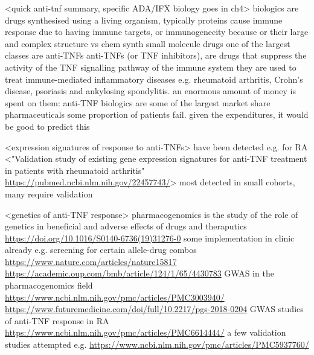 \begin{outline}

\1 <quick anti-tnf summary, specific ADA/IFX biology goes in ch4>
    \2 biologics are drugs synthesised using a living organism, typically proteins
    \2 cause immune response due to having immune targets, or immunogenecity because or their large and complex structure vs chem synth small molecule drugs
    \2 one of the largest classes are anti-TNFs
    \2 anti-TNFs (or TNF inhibitors), are drugs that suppress the activity of the TNF signalling pathway of the immune system
    \2 they are used to treat immune-mediated inflammatory diseases e.g. rheumatoid arthritis, Crohn's disease, psoriasis and ankylosing spondylitis.
    \2 an enormous amount of money is spent on them: anti-TNF biologics are some of the largest market share pharmaceuticals
    \2 some proportion of patients fail. given the expenditures, it would be good to predict this


\1 <expression signatures of response to anti-TNFs>
    \2 have been detected e.g. for RA <"Validation study of existing gene expression signatures for anti-TNF treatment in patients with rheumatoid arthritis" \url{https://pubmed.ncbi.nlm.nih.gov/22457743/}>
    \2 most detected in small cohorts, many require validation

\1 <genetics of anti-TNF response>
    \2 pharmacogenomics is the study of the role of genetics in beneficial and adverse effects of drugs and theraputics \url{https://doi.org/10.1016/S0140-6736(19)31276-0}
    \2 some implementation in clinic already e.g. screening for certain allele-drug combos \url{https://www.nature.com/articles/nature15817} \url{https://academic.oup.com/bmb/article/124/1/65/4430783}
    \2 GWAS in the pharmacogenomics field \url{https://www.ncbi.nlm.nih.gov/pmc/articles/PMC3003940/} \url{https://www.futuremedicine.com/doi/full/10.2217/pgs-2018-0204}
    \2 GWAS studies of anti-TNF response in RA \url{https://www.ncbi.nlm.nih.gov/pmc/articles/PMC6614444/}
        \3 a few validation studies attempted e.g. \url{https://www.ncbi.nlm.nih.gov/pmc/articles/PMC5937760/}


\end{outline}
